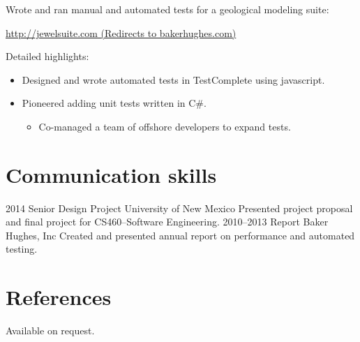 \documentclass[]{friggeri-cv} %
\begin{document}
\begin{entrylist}
{Wrote and ran manual and automated tests for a geological modeling suite:
\begin{center}
	\href{http://jewelsuite.com}{http://jewelsuite.com (Redirects to bakerhughes.com)}
\end{center}
Detailed highlights:
\begin{itemize}
\item Designed and wrote automated tests in TestComplete using javascript.
\item Pioneered adding unit tests written in C\#.
\begin{itemize}
	\item Co-managed a team of offshore developers to expand tests.
\end{itemize}
\end{itemize}
}
\end{entrylist}


\section{Communication skills}

\begin{entrylist}
\entry
{2014}
{Senior Design Project}
{University of New Mexico}
{Presented project proposal and final project for CS460--Software Engineering.}
\entry
{2010--2013}
{Report}
{Baker Hughes, Inc}
{Created and presented annual report on performance and automated testing.}
 \end{entrylist}


\section{References}

Available on request.
\end{document}
